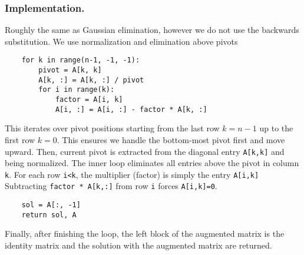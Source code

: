 \documentclass[../../../main.tex]{subfiles}
\begin{document}
\subsubsection{Implementation.}
Roughly the same as Gaussian elimination, however we do not use the backwards substitution.
We use normalization and elimination above pivots
\begin{verbatim}
    for k in range(n-1, -1, -1):  
        pivot = A[k, k]
        A[k, :] = A[k, :] / pivot 
        for i in range(k):
            factor = A[i, k]
            A[i, :] = A[i, :] - factor * A[k, :]
\end{verbatim}
This iterates over pivot positions starting from the last row $k=n-1$ up to the first row $k=0$. 
This ensures we handle the bottom-most pivot first and move upward.
Then, current pivot is extracted from the diagonal entry \verb|A[k,k]| and being normalized.
The inner loop eliminates all entries above the pivot in column \verb|k|.
For each row \verb|i<k|, the multiplier (factor) is simply the entry \verb|A[i,k]|
Subtracting \verb|factor * A[k,:]| from row \verb|i| forces \verb|A[i,k]=0|.
\begin{verbatim}
    sol = A[:, -1]
    return sol, A
\end{verbatim}
Finally, after finishing the loop, the left block of the augmented matrix is the identity matrix and the solution  with the augmented matrix are returned.
\end{document}
